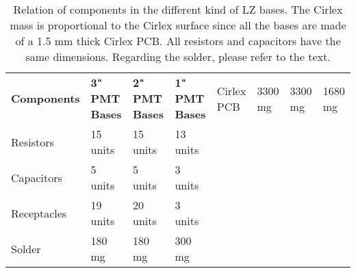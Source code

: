 \begin{table}[h]
\centering
\caption{Relation of components in the different kind of LZ bases. The Cirlex mass is proportional to the Cirlex surface since all the bases are made of a 1.5 mm thick Cirlex PCB. All resistors and capacitors have the same dimensions. Regarding the solder, please refer to the text.}
\label{tab:pmt_base_components}
\vspace{1mm}
\renewcommand{\arraystretch}{1.2}
    \begin{tabularx}{.9\linewidth}{@{\extracolsep{\fill}}llll}
    \toprule
    
    \textbf{Components} & %
    \textbf{3" PMT Bases} & %
    \textbf{2" PMT Bases} & %
    \textbf{1" PMT Bases} & %
    
    \hline
    \hline
    
    Cirlex PCB	    & 3300 mg       & 3300 mg       & 1680 mg   \\
    Resistors       & 15 units      & 15 units      & 13 units  \\       
    Capacitors	    & 5 units       & 5 units       & 3 units   \\        
    Receptacles	    & 19 units      & 20 units      & 3 units   \\       
    Solder  	    & 180 mg        & 180 mg        & 300 mg    \\       
    
    \bottomrule
    \end{tabularx}
\end{table}

